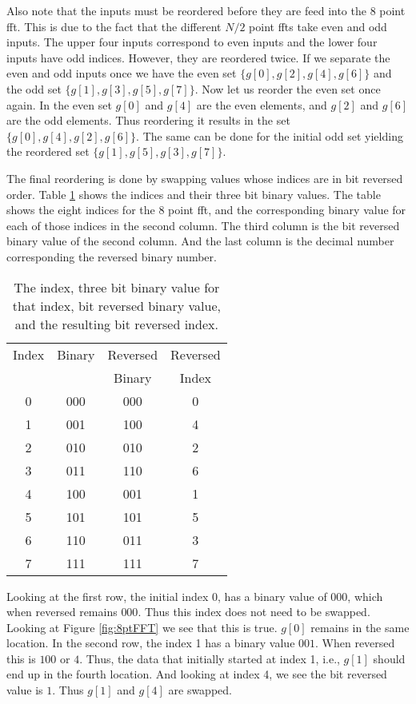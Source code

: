 Also note that the inputs must be reordered before they are feed into the 8 point \gls{fft}. This is due to the fact that the different $N/2$ point \gls{fft}s take even and odd inputs. The upper four inputs correspond to even inputs and the lower four inputs have odd indices. However, they are reordered twice. If we separate the even and odd inputs once we have the even set $\{g[0], g[2], g[4], g[6] \}$ and the odd set $\{g[1], g[3], g[5], g[7] \}$. Now let us reorder the even set once again. In the even set $g[0]$ and $g[4]$ are the even elements, and $g[2]$ and $g[6]$ are the odd elements. Thus reordering it results in the set $\{g[0], g[4], g[2], g[6] \}$. The same can be done for the initial odd set yielding the reordered set $\{g[1], g[5], g[3], g[7] \}$. 

The final reordering is done by swapping values whose indices are in bit reversed order. Table \ref{table:bit_reverse} shows the indices and their three bit binary values. The table shows the eight indices for the 8 point \gls{fft}, and the corresponding binary value for each of those indices in the second column. The third column is the bit reversed binary value of the second column. And the last column is the decimal number corresponding the reversed binary number. 

\begin{table}[htbp]
\caption{The index, three bit binary value for that index, bit reversed binary value, and the resulting bit reversed index.}
\begin{center}
\begin{tabular}{|c|c|c|c|}
\hline
Index & Binary & Reversed & Reversed \\
 & & Binary & Index \\
\hline
0 & 000 & 000 & 0 \\
1 & 001 & 100 & 4 \\
2 & 010 & 010 & 2 \\
3 & 011 & 110 & 6 \\
4 & 100 & 001 & 1 \\
5 & 101 & 101 & 5 \\
6 & 110 & 011 & 3 \\
7 & 111 & 111 & 7 \\
\hline
\end{tabular}
\end{center}
\label{table:bit_reverse}
\end{table}

Looking at the first row, the initial index $0$, has a binary value of $000$, which when reversed remains $000$. Thus this index does not need to be swapped. Looking at Figure \ref{fig:8ptFFT} we see that this is true. $g[0]$ remains in the same location. In the second row, the index 1 has a binary value $001$. When reversed this is $100$ or $4$. Thus, the data that initially started at index 1, i.e., $g[1]$ should end up in the fourth location. And looking at index 4, we see the bit reversed value is $1$. Thus $g[1]$ and $g[4]$ are swapped.  

